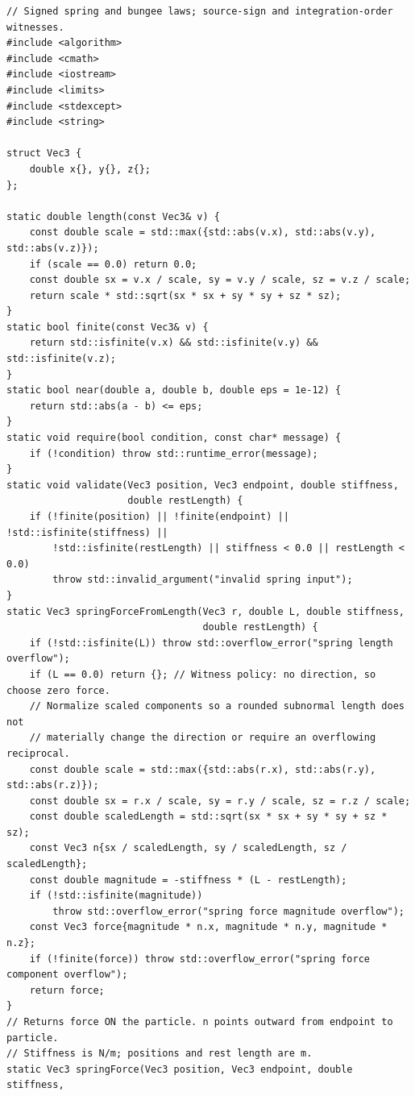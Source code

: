 \begin{verbatim}
// Signed spring and bungee laws; source-sign and integration-order witnesses.
#include <algorithm>
#include <cmath>
#include <iostream>
#include <limits>
#include <stdexcept>
#include <string>

struct Vec3 {
    double x{}, y{}, z{};
};

static double length(const Vec3& v) {
    const double scale = std::max({std::abs(v.x), std::abs(v.y), std::abs(v.z)});
    if (scale == 0.0) return 0.0;
    const double sx = v.x / scale, sy = v.y / scale, sz = v.z / scale;
    return scale * std::sqrt(sx * sx + sy * sy + sz * sz);
}
static bool finite(const Vec3& v) {
    return std::isfinite(v.x) && std::isfinite(v.y) && std::isfinite(v.z);
}
static bool near(double a, double b, double eps = 1e-12) {
    return std::abs(a - b) <= eps;
}
static void require(bool condition, const char* message) {
    if (!condition) throw std::runtime_error(message);
}
static void validate(Vec3 position, Vec3 endpoint, double stiffness,
                     double restLength) {
    if (!finite(position) || !finite(endpoint) || !std::isfinite(stiffness) ||
        !std::isfinite(restLength) || stiffness < 0.0 || restLength < 0.0)
        throw std::invalid_argument("invalid spring input");
}
static Vec3 springForceFromLength(Vec3 r, double L, double stiffness,
                                  double restLength) {
    if (!std::isfinite(L)) throw std::overflow_error("spring length overflow");
    if (L == 0.0) return {}; // Witness policy: no direction, so choose zero force.
    // Normalize scaled components so a rounded subnormal length does not
    // materially change the direction or require an overflowing reciprocal.
    const double scale = std::max({std::abs(r.x), std::abs(r.y), std::abs(r.z)});
    const double sx = r.x / scale, sy = r.y / scale, sz = r.z / scale;
    const double scaledLength = std::sqrt(sx * sx + sy * sy + sz * sz);
    const Vec3 n{sx / scaledLength, sy / scaledLength, sz / scaledLength};
    const double magnitude = -stiffness * (L - restLength);
    if (!std::isfinite(magnitude))
        throw std::overflow_error("spring force magnitude overflow");
    const Vec3 force{magnitude * n.x, magnitude * n.y, magnitude * n.z};
    if (!finite(force)) throw std::overflow_error("spring force component overflow");
    return force;
}
// Returns force ON the particle. n points outward from endpoint to particle.
// Stiffness is N/m; positions and rest length are m.
static Vec3 springForce(Vec3 position, Vec3 endpoint, double stiffness,

\end{verbatim}
